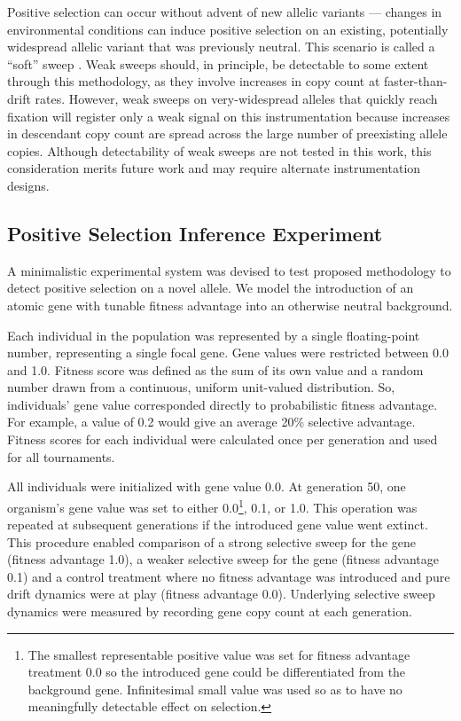 Positive selection can occur without advent of new allelic variants --- changes in environmental conditions can induce positive selection on an existing, potentially widespread allelic variant that was previously neutral.
This scenario is called a ``soft'' sweep \citep{hermisson2005soft}.
Weak sweeps should, in principle, be detectable to some extent through this methodology, as they involve increases in copy count at faster-than-drift rates.
However, weak sweeps on very-widespread alleles that quickly reach fixation will register only a weak signal on this instrumentation because increases in descendant copy count are spread across the large number of preexisting allele copies.
Although detectability of weak sweeps are not tested in this work, this consideration merits future work and may require alternate instrumentation designs.

\subsection{Positive Selection Inference Experiment}
\label{sec:positive-selection-inference-experiment}

A minimalistic experimental system was devised to test proposed methodology to detect positive selection on a novel allele.
We model the introduction of an atomic gene with tunable fitness advantage into an otherwise neutral background.

Each individual in the population was represented by a single floating-point number, representing a single focal gene.
Gene values were restricted between 0.0 and 1.0.
Fitness score was defined as the sum of its own value and a random number drawn from a continuous, uniform unit-valued distribution.
So, individuals' gene value corresponded directly to probabilistic fitness advantage.
For example, a value of 0.2 would give an average 20\% selective advantage.
Fitness scores for each individual were calculated once per generation and used for all tournaments.

All individuals were initialized with gene value 0.0.
At generation 50, one organism's gene value was set to either 0.0\footnote{The smallest representable positive value was set for fitness advantage treatment 0.0 so the introduced gene could be differentiated from the background gene. Infinitesimal small value was used so as to have no meaningfully detectable effect on selection.}, 0.1, or 1.0.
This operation was repeated at subsequent generations if the introduced gene value went extinct.
This procedure enabled comparison of a strong selective sweep for the gene (fitness advantage 1.0), a weaker selective sweep for the gene (fitness advantage 0.1) and a control treatment where no fitness advantage was introduced and pure drift dynamics were at play (fitness advantage 0.0).
Underlying selective sweep dynamics were measured by recording gene copy count at each generation.


